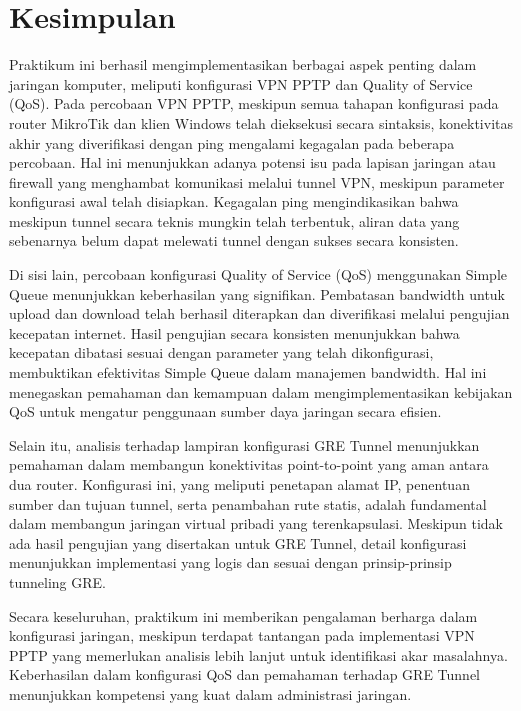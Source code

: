 \section*{Kesimpulan}

Praktikum ini berhasil mengimplementasikan berbagai aspek penting dalam jaringan komputer, meliputi konfigurasi VPN PPTP dan Quality of Service (QoS). Pada percobaan VPN PPTP, meskipun semua tahapan konfigurasi pada router MikroTik dan klien Windows telah dieksekusi secara sintaksis, konektivitas akhir yang diverifikasi dengan ping mengalami kegagalan pada beberapa percobaan. Hal ini menunjukkan adanya potensi isu pada lapisan jaringan atau firewall yang menghambat komunikasi melalui tunnel VPN, meskipun parameter konfigurasi awal telah disiapkan. Kegagalan ping mengindikasikan bahwa meskipun tunnel secara teknis mungkin telah terbentuk, aliran data yang sebenarnya belum dapat melewati tunnel dengan sukses secara konsisten.

Di sisi lain, percobaan konfigurasi Quality of Service (QoS) menggunakan Simple Queue menunjukkan keberhasilan yang signifikan. Pembatasan bandwidth untuk upload dan download telah berhasil diterapkan dan diverifikasi melalui pengujian kecepatan internet. Hasil pengujian secara konsisten menunjukkan bahwa kecepatan dibatasi sesuai dengan parameter yang telah dikonfigurasi, membuktikan efektivitas Simple Queue dalam manajemen bandwidth. Hal ini menegaskan pemahaman dan kemampuan dalam mengimplementasikan kebijakan QoS untuk mengatur penggunaan sumber daya jaringan secara efisien.

Selain itu, analisis terhadap lampiran konfigurasi GRE Tunnel menunjukkan pemahaman dalam membangun konektivitas point-to-point yang aman antara dua router. Konfigurasi ini, yang meliputi penetapan alamat IP, penentuan sumber dan tujuan tunnel, serta penambahan rute statis, adalah fundamental dalam membangun jaringan virtual pribadi yang terenkapsulasi. Meskipun tidak ada hasil pengujian yang disertakan untuk GRE Tunnel, detail konfigurasi menunjukkan implementasi yang logis dan sesuai dengan prinsip-prinsip tunneling GRE.

Secara keseluruhan, praktikum ini memberikan pengalaman berharga dalam konfigurasi jaringan, meskipun terdapat tantangan pada implementasi VPN PPTP yang memerlukan analisis lebih lanjut untuk identifikasi akar masalahnya. Keberhasilan dalam konfigurasi QoS dan pemahaman terhadap GRE Tunnel menunjukkan kompetensi yang kuat dalam administrasi jaringan.